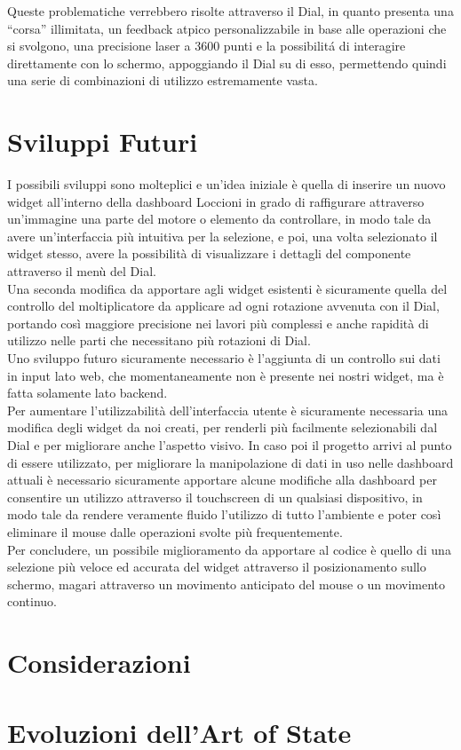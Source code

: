 Queste problematiche verrebbero risolte attraverso il Dial, in quanto presenta una “corsa” illimitata, un feedback atpico personalizzabile in base alle operazioni che si svolgono, una precisione laser a 3600 punti e la possibilitá di interagire direttamente con lo schermo, appoggiando il Dial su di esso, permettendo quindi una serie di combinazioni di utilizzo estremamente vasta.
\section{Sviluppi Futuri}

I possibili sviluppi sono molteplici e un’idea iniziale è quella di inserire un nuovo widget all’interno della dashboard Loccioni in grado di raffigurare attraverso un’immagine una parte del motore o elemento da controllare, in modo tale da avere un’interfaccia più intuitiva per la selezione, e poi, una volta selezionato il widget stesso, avere la possibilità di visualizzare i dettagli del componente attraverso il menù del Dial.\\
Una seconda modifica da apportare agli widget esistenti è sicuramente quella del controllo del moltiplicatore da applicare ad ogni rotazione avvenuta con il Dial, portando così maggiore precisione nei lavori più complessi e anche rapidità di utilizzo nelle parti che necessitano più rotazioni di Dial.\\
Uno sviluppo futuro sicuramente necessario è l’aggiunta di un controllo sui dati in input lato web, che momentaneamente non è presente nei nostri widget, ma è fatta solamente lato backend.\\
Per aumentare l’utilizzabilità dell’interfaccia utente è sicuramente necessaria una modifica degli widget da noi creati, per renderli più facilmente selezionabili dal Dial e per migliorare anche l’aspetto visivo.
In caso poi il progetto arrivi al punto di essere utilizzato, per migliorare la manipolazione di dati in uso nelle dashboard attuali è necessario sicuramente apportare alcune modifiche alla dashboard per consentire un utilizzo attraverso il touchscreen di un qualsiasi dispositivo, in modo tale da rendere veramente fluido l’utilizzo di tutto l’ambiente e poter così eliminare il mouse dalle operazioni svolte più frequentemente.\\
Per concludere, un possibile miglioramento da apportare al codice è quello di una selezione più veloce ed accurata del widget attraverso il posizionamento sullo schermo, magari attraverso un movimento anticipato del mouse o un movimento continuo.
\section{Considerazioni}

\section{Evoluzioni dell'Art of State}